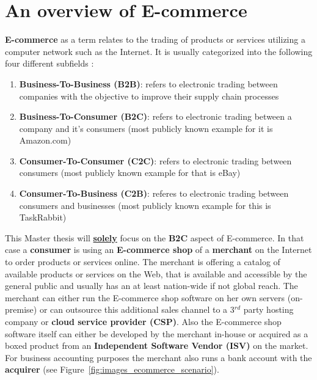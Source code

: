 
\section{An overview of E-commerce}
\label{sec:e_commerce_scenario}

\textbf{E-commerce} as a term relates to the trading of products or services utilizing a computer network such as the Internet. It is usually categorized into the following four different subfields \citep{sen2015study}:\@

\begin{enumerate}
  \item \textbf{Business-To-Business (\gls{B2B})}: refers to electronic trading between companies with the objective to improve their supply chain processes
  \item \textbf{Business-To-Consumer (\gls{B2C})}: refers to electronic trading between a company and it's consumers (most publicly known example for it is Amazon.com)
  \item \textbf{Consumer-To-Consumer (\gls{C2C})}: refers to electronic trading between consumers (most publicly known example for that is eBay)
  \item \textbf{Consumer-To-Business (\gls{C2B})}: referes to electronic trading between consumers and businesses (most publicly known example for this is TaskRabbit)
\end{enumerate}

This Master thesis will \textbf{\underline{solely}} focus on the \textbf{\gls{B2C}} aspect of E-commerce. In that case a \textbf{consumer} is using an \textbf{E-commerce shop} of a \textbf{merchant} on the Internet to order products or services online. The merchant is offering a catalog of available products or services on the Web, that is available and accessible by the general public and usually has an at least nation-wide if not global reach. The merchant can either run the E-commerce shop software on her own servers (on-premise) or can outsource this additional sales channel to a 3$^{rd}$ party hosting company or \textbf{cloud service provider (\gls{CSP})}. Also the E-commerce shop software itself can either be developed by the merchant in-house or acquired as a boxed product from an \textbf{Independent Software Vendor (\gls{ISV})} on the market. For business accounting purposes the merchant also runs a bank account with the \textbf{acquirer} (see Figure~\ref{fig:images_ecommerce_scenario}). \\

